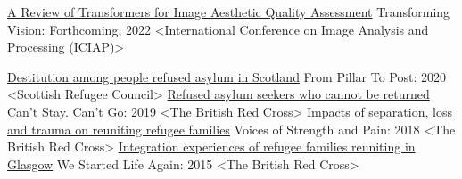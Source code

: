 \begin{cventries}

\cventry
      {\href{https://www.iciap2021.org/}{A Review of Transformers for Image Aesthetic Quality Assessment}} %
    {Transforming Vision:} %
    {} %
    {Forthcoming, 2022} %
    {<International Conference on Image Analysis and Processing (ICIAP)>\newline}
    
\end{cventries}
 
 
 \begin{cventries}
\cventry
   {\href{https://www.rst.org.uk/wp-content/uploads/2019/03/From-Pillar-to-Post-Feb-2019.pdf}
        {Destitution among people refused asylum in Scotland}}
        {From Pillar To Post:}
        {}
        {2020}
        {<Scottish Refugee Council>}
        \vspace{10pt}
\cventry
   {\href{https://www.refworld.org/docid/591965984.html}
        {Refused asylum seekers who cannot be returned}}
        {Can’t Stay. Can’t Go:}
        {}
        {2019}
        {<The British Red Cross>}
        \vspace{10pt}
\cventry
   {\href{https://www.redcross.org.uk/-/media/documents/about-us/research-publications/refugee-support/british-red-cross-voices-of-strength-and-pain.pdf}
        {Impacts of separation, loss and trauma on reuniting refugee families}}
        {Voices of Strength and Pain:}
        {}
        {2018}
        {<The British Red Cross>}
        \vspace{10pt}
\cventry
   {\href{https://www.refworld.org/docid/560cde294.html}
        {Integration experiences of refugee families reuniting in Glasgow}}
        {We Started Life Again:}
        {}
        {2015}
        {<The British Red Cross>}
\end{cventries}
